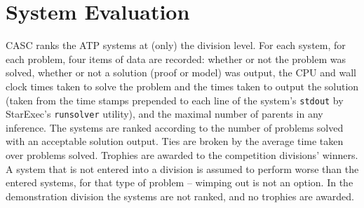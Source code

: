 \documentclass[aic]{iosart2x}
\newcommand{\smalltt}[1]{\small \texttt{#1}}
\begin{document}
\section{System Evaluation}
\label{Evaluation}

CASC ranks the ATP systems at (only) the division level.
For each system, for each problem, four items of data are recorded:
whether or not the problem was solved,
whether or not a solution (proof or model) was output,
the CPU and wall clock times taken to solve the problem and the times taken to output the
solution (taken from the time stamps prepended to each line of the system's \smalltt{stdout}
by StarExec's \smalltt{runsolver} utility),
and
the maximal number of parents in any inference.
The systems are ranked according to the number of problems solved with an acceptable solution 
output.
Ties are broken by the average time taken over problems solved.
Trophies are awarded to the competition divisions' winners.
A system that is not entered into a division is assumed to perform worse than the entered systems,
for that type of problem -- wimping out is not an option.
In the demonstration division the systems are not ranked, and no trophies are awarded.
\end{document}
